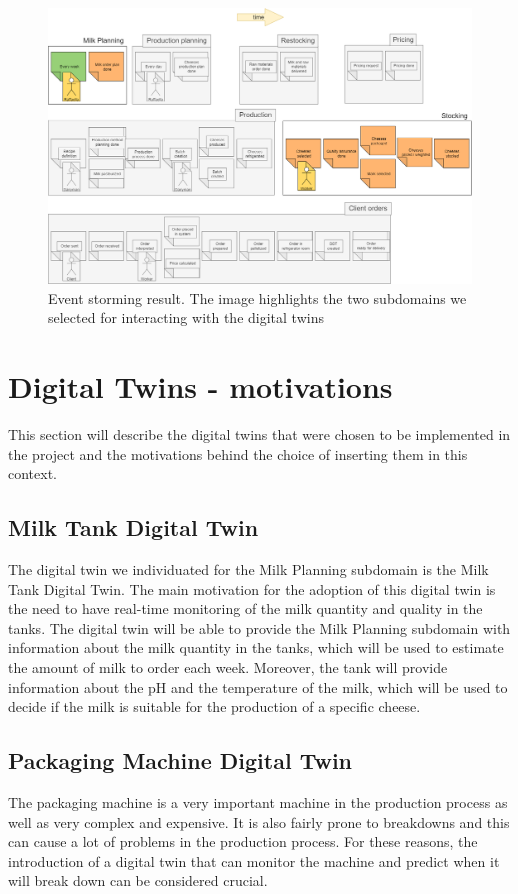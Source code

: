 \begin{figure}[H]
    \centering
    \includegraphics[width=\textwidth]{img/event-storming.png}
    \caption{Event storming result. The image highlights the two subdomains we selected for interacting with the digital twins}
    \label{img:event-storming}
\end{figure}

\section{Digital Twins - motivations}\label{sec:dt-motivations}
This section will describe the digital twins that were chosen to be implemented in the project and the motivations behind the choice of inserting them in this context.

\subsection{Milk Tank Digital Twin}
The digital twin we individuated for the Milk Planning subdomain is the Milk Tank Digital Twin.
The main motivation for the adoption of this digital twin is the need to have real-time monitoring of the milk quantity and quality in the tanks.
The digital twin will be able to provide the Milk Planning subdomain with information about the milk quantity in the tanks, which will be used to estimate the amount of milk to order each week.
Moreover, the tank will provide information about the pH and the temperature of the milk, which will be used to decide if the milk is suitable for the production of a specific cheese.

\subsection{Packaging Machine Digital Twin}
The packaging machine is a very important machine in the production process as well as very complex and expensive.
It is also fairly prone to breakdowns and this can cause a lot of problems in the production process.
For these reasons, the introduction of a digital twin that can monitor the machine and predict when it will break down can be considered crucial.

